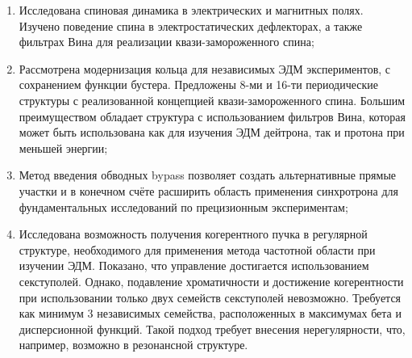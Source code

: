 \begin{enumerate}

\item Исследована спиновая динамика в электрических и магнитных полях. Изучено поведение спина в электростатических дефлекторах, а также фильтрах Вина для реализации квази-замороженного спина;

\item Рассмотрена модернизация кольца для независимых ЭДМ экспериментов, с сохранением функции бустера. Предложены 8-ми и 16-ти периодические структуры с реализованной концепцией квази-замороженного спина. Большим преимуществом обладает структура с использованием фильтров Вина, которая может быть использована как для изучения ЭДМ дейтрона, так и протона при меньшей энергии;

\item Метод введения обводных bypass позволяет создать альтернативные прямые участки и в конечном счёте расширить область применения синхротрона для фундаментальных исследований по прецизионным экспериментам; 

\item Исследована возможность получения когерентного пучка в регулярной структуре, необходимого для применения метода частотной области при изучении ЭДМ. Показано, что управление достигается использованием секступолей. Однако, подавление хроматичности и достижение когерентности при использовании только двух семейств секступолей невозможно. Требуется как минимум 3 независимых семейства, расположенных в максимумах бета и дисперсионной функций. Такой подход требует внесения нерегулярности, что, например, возможно в резонансной структуре.

\end{enumerate}

\FloatBarrier
